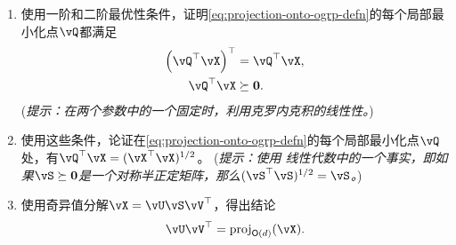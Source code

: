 \documentclass[../../book-main.tex]{subfiles}
\begin{document}
\begin{exercise}
\begin{enumerate}
        \begin{enumerate}
            \item 使用一阶和二阶最优性条件，证明\eqref{eq:projection-onto-ogrp-defn}的每个局部最小化点$\vQ$都满足
            \begin{align*}
                \left( \vQ^\top \vX \right)^\top &= \vQ^\top \vX, \\
                \vQ^\top \vX &\succeq \mathbf{0}.
            \end{align*}
            (\textit{提示：在两个参数中的一个固定时，利用克罗内克积的线性性。})
            \item 使用这些条件，论证在\eqref{eq:projection-onto-ogrp-defn}的每个局部最小化点$\vQ$处，有$\vQ^\top \vX = (\vX^\top \vX)^{1/2}$。
            (\textit{提示：使用%
            线性代数中的一个事实，即如果$\vS \succeq \mathbf{0}$是一个对称半正定矩阵，那么$(\vS^\top\vS)^{1/2} = \vS$。})
            \item 使用奇异值分解$\vX = \vU \vS \vV^\top$，得出结论
            \begin{equation*}
                \vU \vV^\top
                =
                \mathrm{proj}_{\O(d)}(\vX).
            \end{equation*}
        \end{enumerate}
    \end{enumerate}
\end{exercise}

\end{document}
